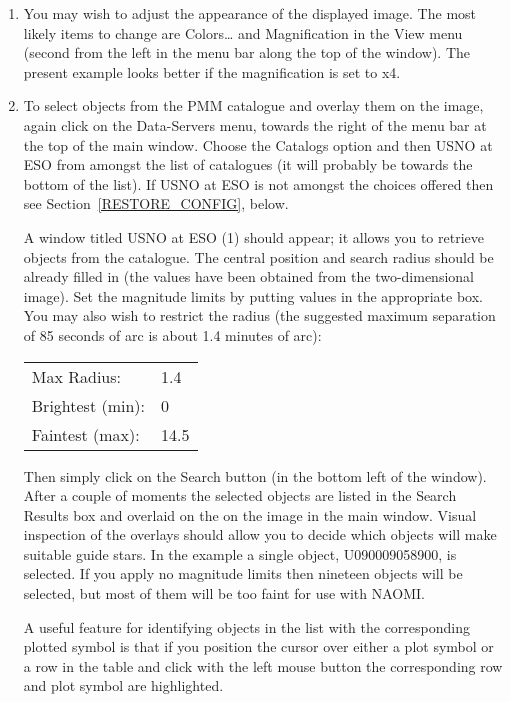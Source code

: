 \documentclass[twoside,11pt]{article}
\renewcommand{\_}{\texttt{\symbol{95}}}
\begin{document}
\begin{enumerate}
  \item You may wish to adjust the appearance of the displayed image.
   The most likely items to change are {\sf Colors\ldots} and {\sf
   Magnification} in the {\sf View} menu (second from the left in the
   menu bar along the top of the window).  The present example looks
   better if the magnification is set to {\sf x4}.

  \item To select objects from the PMM catalogue and overlay them on the
   image, again click on the {\sf Data-Servers} menu, towards the right of
   the menu bar at the top of the main window.  Choose the {\sf Catalogs}
   option and then {\sf USNO at ESO} from amongst the list of catalogues
   (it will probably be towards the bottom of the list).  If {\sf USNO at
   ESO} is not amongst the choices offered then see
   Section~\ref{RESTORE_CONFIG}, below.

   A window titled {\sf USNO at ESO (1)} should appear; it allows you
   to retrieve objects from the catalogue.  The central position and
   search radius should be already filled in (the values have been obtained
   from the two-dimensional image).  Set the magnitude limits by putting
   values in the appropriate box.  You may also wish to restrict the radius
   (the suggested maximum separation of 85 seconds of arc is about 1.4
   minutes of arc):

  \begin{center}
  \begin{tabular}{ll}
   {\sf Max Radius:}      & 1.4 \\
   {\sf Brightest (min):} & 0 \\
   {\sf Faintest (max):}  & 14.5 \\
  \end{tabular}
  \end{center}

   Then simply click on the {\sf Search} button (in the bottom left of the
   window).  After a couple of moments the selected objects are listed
   in the {\sf Search Results} box and overlaid on the on the image in
   the main window.  Visual inspection of the overlays should allow you
   to decide which objects will make suitable guide stars.  In the example
   a single object, U0900\_09058900, is selected.  If you apply no magnitude
   limits then nineteen objects will be selected, but most of them will be
   too faint for use with NAOMI.

   A useful feature for identifying objects in the list with the
   corresponding plotted symbol is that if you position the cursor over 
   either a plot symbol or a row in the table and click with the left
   mouse button the corresponding row and plot symbol are highlighted.


\end{enumerate}
\end{document}
